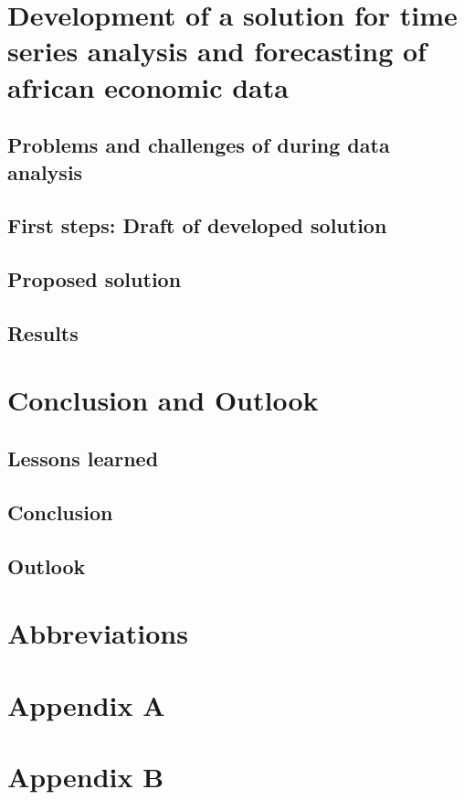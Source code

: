 \chapter{Development of a solution for time series analysis and forecasting of african economic data}\label{development}
\section{Problems and challenges of during data analysis}\label{problems_challenges}

\section{First steps: Draft of developed solution}\label{draft}

\section{Proposed solution}\label{proposed_solution}

\section{Results}\label{results}

\chapter{Conclusion and Outlook}\label{conclusion_outlook}
\section{Lessons learned}\label{lessons_learned}

\section{Conclusion}\label{conclusion}

\section{Outlook}\label{outlook}

\chapter{Abbreviations}

\printbibliography

\chapter{Appendix A}\label{appendix a}

\chapter{Appendix B}\label{appendix b}
%


